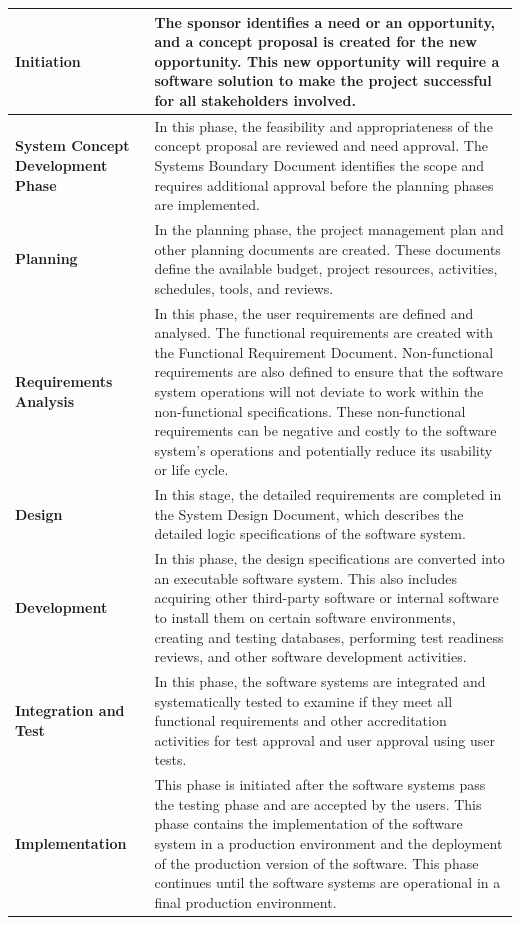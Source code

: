 \begin{xltabular}{\textwidth}{|l|X|}
	\textbf{Initiation} & The sponsor identifies a need or an opportunity, and a concept proposal is created for the new opportunity. This new opportunity will require a software solution to make the project successful for all stakeholders involved.\\ \hline
	\textbf{System Concept Development Phase} & In this phase, the feasibility and appropriateness of the concept proposal are reviewed and need approval. The Systems Boundary Document identifies the scope and requires additional approval before the planning phases are implemented. \\ \hline
	\textbf{Planning} & In the planning phase, the project management plan and other planning documents are created. These documents define the available budget, project resources, activities, schedules, tools, and reviews. \\ \hline
	\textbf{Requirements Analysis} & In this phase, the user requirements are defined and analysed. The functional requirements are created with the Functional Requirement Document. Non-functional requirements are also defined to ensure that the software system operations will not deviate to work within the non-functional specifications. These non-functional requirements can be negative and costly to the software system's operations and potentially reduce its usability or life cycle. \\ \hline
	\textbf{Design} & In this stage, the detailed requirements are completed in the System Design Document, which describes the detailed logic specifications of the software system. \\ \hline
	\textbf{Development} & In this phase, the design specifications are converted into an executable software system. This also includes acquiring other third-party software or internal software to install them on certain software environments, creating and testing databases, performing test readiness reviews, and other software development activities. \\ \hline
	\textbf{Integration and Test} & In this phase, the software systems are integrated and systematically tested to examine if they meet all functional requirements and other accreditation activities for test approval and user approval using user tests. \\ \hline
	\textbf{Implementation} & This phase is initiated after the software systems pass the testing phase and are accepted by the users. This phase contains the implementation of the software system in a production environment and the deployment of the production version of the software. This phase continues until the software systems are operational in a final production environment.\\ \hline

\end{xltabular}
